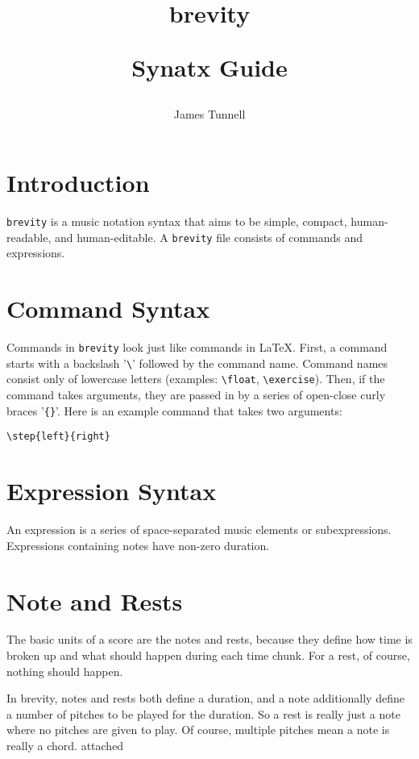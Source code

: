 \documentclass{scrartcl}
\begin{document}
\author{James Tunnell}
\title{brevity\\
\begin{LARGE}
Synatx Guide
\end{LARGE}}
\maketitle
\tableofcontents

\section{Introduction}
\verb|brevity| is a music notation syntax that aims to be simple, compact, human-readable, and human-editable. A \verb|brevity| file consists of commands and expressions.

\section{Command Syntax}
Commands in \verb|brevity| look just like commands in \LaTeX. First, a command starts with a backslash '\verb|\|' followed by the command name. Command names consist only of lowercase letters (examples: \verb|\float|, \verb|\exercise|). Then, if the command takes arguments, they are passed in by a series of open-close curly braces '\verb|{}|'. Here is an example command that takes two arguments:

\begin{tabbing}
  \hspace{0.5in}\= \verb|\step{left}{right}|
\end{tabbing}

\section{Expression Syntax}
An expression is a series of space-separated music elements or subexpressions. Expressions containing notes have non-zero duration.

\section{Note and Rests}
The basic units of a score are the notes and rests, because they define how time is broken up and what should happen during each time chunk. For a rest, of course, nothing should happen. 

In brevity, notes and rests both define a duration, and a note additionally define a number of pitches to be played for the duration. So a rest is really just a note where no pitches are given to play. Of course, multiple pitches mean a note is really a chord.
attached
\end{document}
